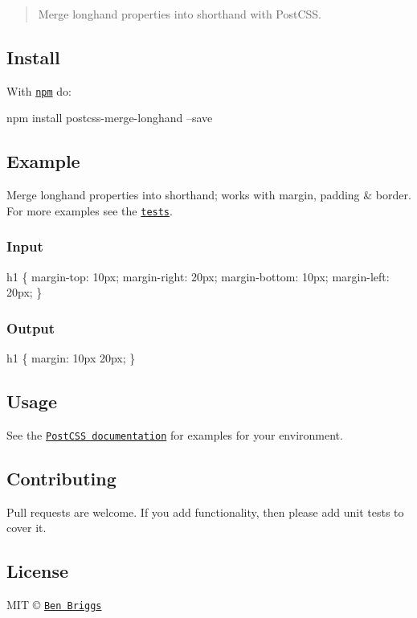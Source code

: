 \begin{quote}
Merge longhand properties into shorthand with Post\+C\+SS. \end{quote}


\subsection*{Install}

With \href{https://npmjs.org/package/postcss-merge-longhand}{\tt npm} do\+:


\begin{DoxyCode}
npm install postcss-merge-longhand --save
\end{DoxyCode}


\subsection*{Example}

Merge longhand properties into shorthand; works with {\ttfamily margin}, {\ttfamily padding} \& {\ttfamily border}. For more examples see the \href{src/__tests__/index.js}{\tt tests}.

\subsubsection*{Input}


\begin{DoxyCode}
h1 \{
    margin-top: 10px;
    margin-right: 20px;
    margin-bottom: 10px;
    margin-left: 20px;
\}
\end{DoxyCode}


\subsubsection*{Output}


\begin{DoxyCode}
h1 \{
    margin: 10px 20px;
\}
\end{DoxyCode}


\subsection*{Usage}

See the \href{https://github.com/postcss/postcss#usage}{\tt Post\+C\+SS documentation} for examples for your environment.

\subsection*{Contributing}

Pull requests are welcome. If you add functionality, then please add unit tests to cover it.

\subsection*{License}

M\+IT © \href{http://beneb.info}{\tt Ben Briggs} 